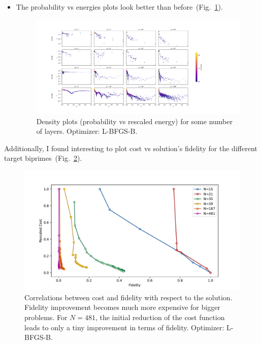 \documentclass[12pt, letterpaper]{article}
\begin{document}
\begin{itemize}
    \item The probability vs energies plots look better than before~(Fig.~\ref{fig:prob_eigenstates}).
    \begin{figure}[h]
        \centering
        \includegraphics[width=1\textwidth]{prob_eigenstates.pdf}
        \caption{Density plots (probability vs rescaled energy) for some number of layers.
         Optimizer: L-BFGS-B.}
        \label{fig:prob_eigenstates}
    \end{figure}
\end{itemize}

\noindent Additionally, I found interesting to plot cost vs solution's fidelity for the different
target biprimes~(Fig.~\ref{fig:cost_fidelity}). 
\begin{figure}[h]
    \centering
    \includegraphics[width=1\textwidth]{cost_fidelity.pdf}
    \caption{Correlations between cost and fidelity with respect to the solution. Fidelity
    improvement becomes much more expensive for bigger problems. For $N=481$, the initial reduction
    of the cost function leads to only a tiny improvement in terms of fidelity. Optimizer: L-BFGS-B.}
    \label{fig:cost_fidelity}
\end{figure}
\end{document}
